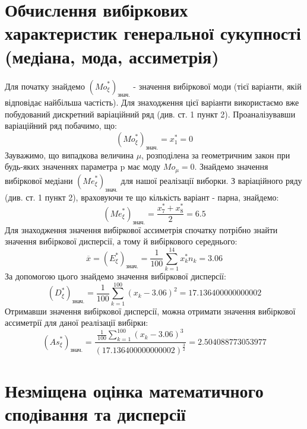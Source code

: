\documentclass{article}
\begin{document}
\section{Обчислення вибіркових характеристик генеральної 
сукупності (медіана, мода, ассиметрія)}
Для початку знайдемо $({Mo}_\xi^*)_{\text{знач.}}$ - 
значення вибіркової моди (тієї варіанти, якій відповідає 
найбільша частість). Для знаходження цієї варіанти використаємо
вже побудований дискретний варіаційний ряд (див. ст. 1 пункт 2).
Проаналізувавши варіаційний ряд побачимо, що:
$$({Mo}_\xi^*)_{\text{знач.}} = x_1^* = 0$$
Зауважимо, що випадкова величина $\mu$, розподілена за 
геометричним закон при будь-яких значеннях параметра p
має моду ${Mo}_\mu = 0$.
\newline
\newline
Знайдемо значення вибіркової медіани $({Me}_\xi^*)_{\text{знач.}}$ 
для нашої реалізації виборки. З варіаційного ряду (див. ст. 1 
пункт 2), враховуючи те що кількість варіант - парна, 
знайдемо:$$ ({Me}_\xi^*)_{\text{знач.}} = \frac{x_7^* + x_8^*}
{2} = 6.5 $$
\newline
Для знаходження значення вибіркової ассиметрія спочатку потрібно 
знайти значення вибіркової дисперсії, а тому й вибіркового середнього: 
$$\overline{x} = (E^*_{\xi})_{\text{знач.}} = \frac{1}{100} 
\sum_{k = 1}^{14} x_k^* n_k = 3.06$$
За допомогою цього знайдемо значення вибіркової дисперсії:
$$(D^*_{\xi})_{\text{знач.}} = \frac{1}{100} \sum_{k = 1}^{100}
(x_k - 3.06)^2 = 17.136400000000002$$
Отримавши значення вибіркової дисперсії, можна отримати значення
вибіркової ассиметрії для даної реалізації вибірки:
$$({As}_{\xi}^*)_{\text{знач.}} = \frac{\frac{1}{100}
\sum_{k = 1}^{100}(x_k - 3.06)^3}{(17.136400000000002)^
{\frac{3}{2}}} = 2.504088773053977$$
\section{Незміщена оцінка математичного сподівання та дисперсії}
\end{document}
